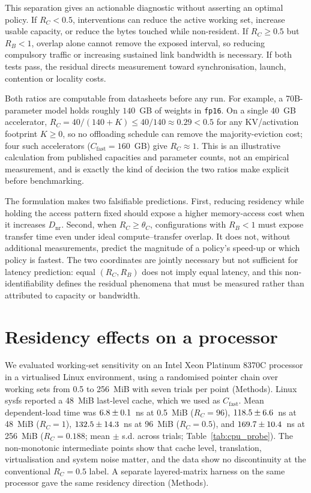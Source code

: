 This separation gives an actionable diagnostic without asserting an optimal
policy. If $R_C<0.5$, interventions can reduce the active working set, increase
usable capacity, or reduce the bytes touched while non-resident. If
$R_C\geq0.5$ but $R_B<1$, overlap alone cannot remove the exposed interval, so
reducing compulsory traffic or increasing sustained link bandwidth is
necessary. If both tests pass, the residual directs measurement toward
synchronisation, launch, contention or locality costs.

Both ratios are computable from datasheets before any run. For example, a
70B-parameter model holds roughly $140$~GB of weights in \texttt{fp16}. On a
single $40$~GB accelerator, $R_C=40/(140+K)\leq 40/140\approx 0.29<0.5$ for any
KV/activation footprint $K\geq0$, so no offloading schedule can remove the
majority-eviction cost; four such accelerators ($C_{\mathrm{fast}}=160$~GB)
give $R_C\approx1$. This is an illustrative calculation from published
capacities and parameter counts, not an empirical measurement, and is exactly
the kind of decision the two ratios make explicit before benchmarking.

The formulation makes two falsifiable predictions. First, reducing residency
while holding the access pattern fixed should expose a higher memory-access
cost when it increases $D_{\mathrm{nr}}$. Second, when $R_C\geq\theta_C$,
configurations with $R_B<1$ must expose transfer time even under ideal
compute--transfer overlap. It does not, without additional measurements,
predict the magnitude of a policy's speed-up or which policy is fastest. The two
coordinates are jointly necessary but not sufficient for latency prediction:
equal $(R_C,R_B)$ does not imply equal latency, and this non-identifiability
defines the residual phenomena that must be measured rather than attributed to
capacity or bandwidth.

\section*{Residency effects on a processor}
\label{sec:experiments}

We evaluated working-set sensitivity on an Intel Xeon Platinum 8370C processor
in a virtualised Linux environment, using a randomised pointer chain over
working sets from 0.5 to 256~MiB with seven trials per point (Methods). Linux
sysfs reported a 48~MiB last-level cache, which we used as
$C_{\mathrm{fast}}$. Mean dependent-load time was
$6.8\pm0.1$~ns at 0.5~MiB ($R_C=96$),
$118.5\pm6.6$~ns at 48~MiB ($R_C=1$),
$132.5\pm14.3$~ns at 96~MiB ($R_C=0.5$), and
$169.7\pm10.4$~ns at 256~MiB ($R_C=0.188$; mean $\pm$ s.d. across
trials; Table~\ref{tab:cpu_probe}). The non-monotonic intermediate points show
that cache level, translation, virtualisation and system noise matter, and the
data show no discontinuity at the conventional $R_C=0.5$ label. A separate
layered-matrix harness on the same processor gave the same residency direction
(Methods).

